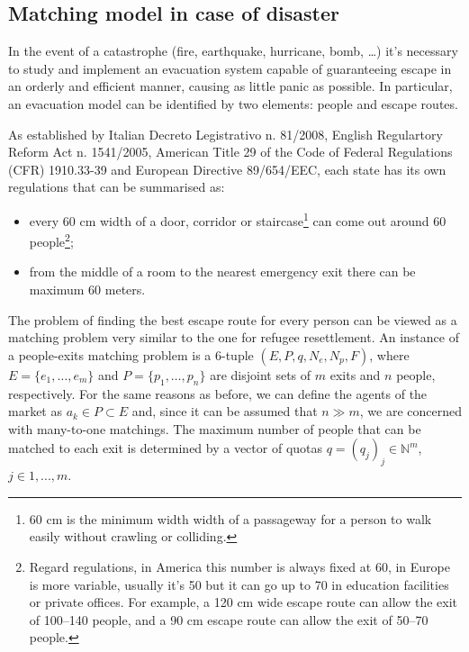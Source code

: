 \subsection{Matching model in case of disaster}\label{matching-model-in-case-of-disaster}%


In the event of a catastrophe (fire, earthquake, hurricane, bomb, \ldots) it's necessary to study and implement an evacuation system capable of guaranteeing escape in an orderly and efficient manner, causing as little panic as possible. In particular, an evacuation model can be identified by two elements: people and escape routes.

\nocite{it-81-2008,uk-1541-2005,usa-1910-1974,cee-654-1989}%
As established by Italian Decreto Legistrativo n. 81/2008, English Regulartory Reform Act n. 1541/2005, American Title 29 of the Code of Federal Regulations (CFR)
1910.33-39 and European Directive 89/654/EEC, each state has its own regulations that can be summarised as:
\begin{itemize}
    \item every 60 cm width of a door, corridor or staircase\footnote{60 cm is the minimum width width of a passageway for a person to walk easily without crawling or colliding.} can come out around 60 people\footnote{Regard regulations, in America this number is always fixed at 60, in Europe is more variable, usually it's 50 but it can go up to 70 in education facilities or private offices. For example, a 120 cm wide escape route can allow the exit of 100--140 people, and a 90 cm escape route can allow the exit of 50--70 people.};
    \item from the middle of a room to the nearest emergency exit there can be maximum 60 meters.
\end{itemize}

The problem of finding the best escape route for every person can be viewed as a matching problem very similar to the one for refugee resettlement. An instance of a people-exits matching problem is a 6-tuple \((E, P, q, N_e, N_p, F)\), where \(E = \{e_1, \dots, e_m\}\) and \(P = \{p_1, \dots, p_n\}\) are disjoint sets of \(m\) exits and \(n\) people, respectively.
For the same reasons as before, we can define the agents of the market as \(a_k \in P \subset E\) and, since it can be assumed that \(n \gg m\), we are concerned with many-to-one matchings.
The maximum number of people that can be matched to each exit is determined by a vector of quotas \(q = (q_j)_j \in \mathbb{N}^m\), \(j\in {1,...,m}\).

